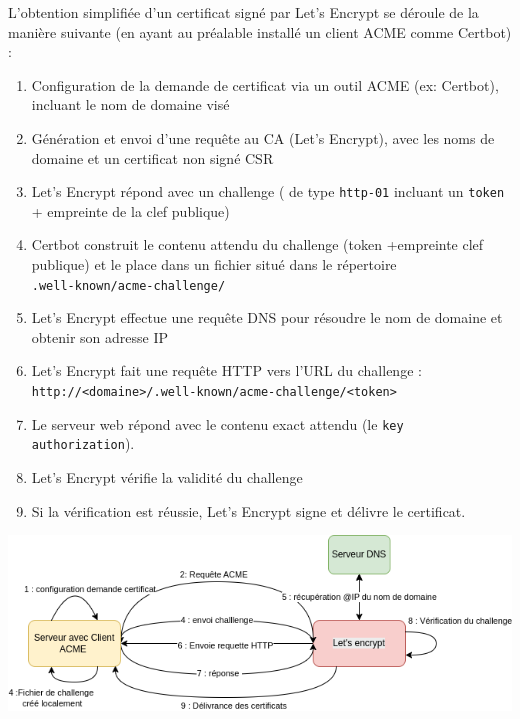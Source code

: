 \documentclass[french, 12pt]{article}%
\begin{document}
L'obtention simplifiée d'un certificat signé par Let's Encrypt se déroule de la manière suivante (en ayant au préalable installé un client ACME comme Certbot) :
\begin{enumerate}
    \item Configuration de la demande de certificat via un outil ACME (ex: Certbot), incluant le nom de domaine visé
    
    \item Génération et envoi d'une requête au CA (Let's Encrypt), avec les noms de domaine et un certificat non signé CSR
    
    \item Let's Encrypt répond avec un challenge ( de type \verb?http-01? incluant un \verb?token? + empreinte de la clef publique)
    
    \item Certbot construit le contenu attendu du challenge (token +empreinte clef publique) et le place dans un fichier situé dans le répertoire\\  \verb?.well-known/acme-challenge/?
    
    
    \item Let's Encrypt effectue une requête DNS pour résoudre le nom de domaine et obtenir son adresse IP 
    
    \item Let's Encrypt fait une requête HTTP vers l’URL du challenge :\\
          \texttt{http://<domaine>/.well-known/acme-challenge/<token>}
    
    \item Le serveur web répond avec le contenu exact attendu (le \texttt{key authorization}).
    
    \item Let's Encrypt vérifie la validité du challenge 
    
    \item Si la vérification est réussie, Let's Encrypt signe et délivre le certificat.
\end{enumerate}


\begin{center}
\includegraphics[scale=0.7]{./ressource/schemaACME.png}
\end{center}
\end{document}
